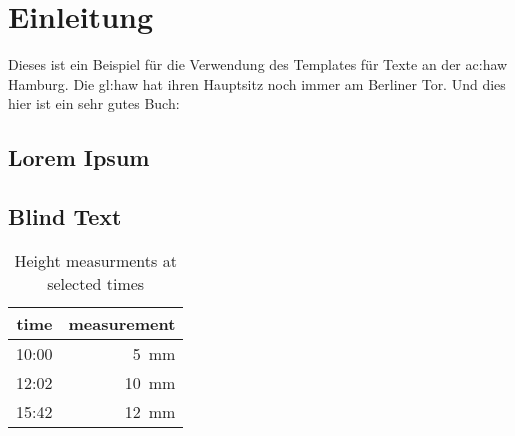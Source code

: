 %

\chapter{Einleitung}
Dieses ist ein Beispiel für die Verwendung des Templates für Texte an der \gls{ac:haw} Hamburg.
Die \gls{gl:haw} hat ihren Hauptsitz noch immer am Berliner Tor.
Und dies hier ist ein sehr gutes Buch: \cite{adams1995douglas}

\section{Lorem Ipsum}
\lipsum

\section{Blind Text}
\blindtext


\blindmathtrue
\blindmathfalse

\begin{table}[ht]
  \caption{Height measurments at selected times}\label{table:measurements}
  \begin{center}
    \begin{tabular}{r|r}
      time & measurement\\
      \hline
      10:00 &  5~mm\\
      12:02 & 10~mm\\
      15:42 & 12~mm\\
    \end{tabular}
  \end{center}
\end{table}

\lipsum
